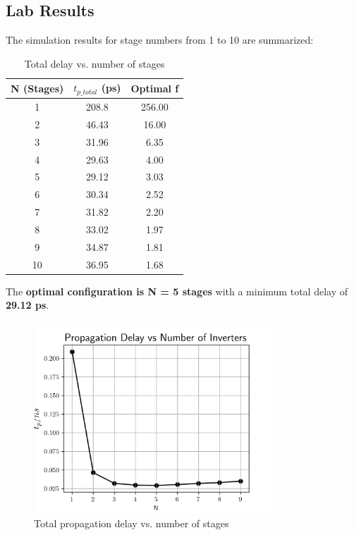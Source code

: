 \documentclass[UTF8,12pt,a4paper]{ctexart}
\begin{document}
\subsection{Lab Results}

The simulation results for stage numbers from 1 to 10 are summarized:

\begin{table}[h]
\centering
\begin{tabular}{ccc}
\toprule
\textbf{N (Stages)} & \textbf{$t_{p\_total}$ (ps)} & \textbf{Optimal f} \\
\midrule
1 & 208.8 & 256.00 \\
2 & 46.43 & 16.00 \\
3 & 31.96 & 6.35 \\
4 & 29.63 & 4.00 \\
5 & 29.12 & 3.03 \\
6 & 30.34 & 2.52 \\
7 & 31.82 & 2.20 \\
8 & 33.02 & 1.97 \\
9 & 34.87 & 1.81 \\
10 & 36.95 & 1.68 \\
\bottomrule
\end{tabular}
\caption{Total delay vs. number of stages}
\end{table}

The \textbf{optimal configuration is N = 5 stages} with a minimum total delay of \textbf{29.12 ps}.

\begin{figure}[h]
\centering
\includegraphics[width=0.8\textwidth]{Task5/tp_N.png}
\caption{Total propagation delay vs. number of stages}
\label{fig:task5_delay}
\end{figure}
\end{document}
